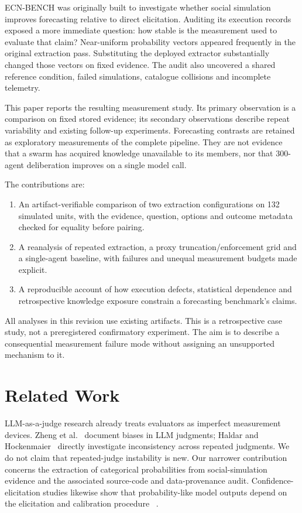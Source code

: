 \documentclass[10pt,conference]{IEEEtran}
\begin{document}
ECN-BENCH was originally built to investigate whether social simulation improves
forecasting relative to direct elicitation. Auditing its execution records exposed
a more immediate question: how stable is the measurement used to evaluate that
claim? Near-uniform probability vectors appeared frequently in the original
extraction pass. Substituting the deployed extractor substantially changed those
vectors on fixed evidence. The audit also uncovered a shared reference condition,
failed simulations, catalogue collisions and incomplete telemetry.

This paper reports the resulting measurement study. Its primary observation is
a comparison on fixed stored evidence; its secondary observations describe
repeat variability and existing follow-up experiments. Forecasting contrasts
are retained as exploratory measurements of the complete pipeline. They are
not evidence that a swarm has acquired knowledge unavailable to its members,
nor that 300-agent deliberation improves on a single model call.

The contributions are:
\begin{enumerate}
\item An artifact-verifiable comparison of two extraction configurations on
132 simulated units, with the evidence, question, options and outcome metadata
checked for equality before pairing.
\item A reanalysis of repeated extraction, a proxy truncation/enforcement grid
and a single-agent baseline, with failures and unequal measurement budgets
made explicit.
\item A reproducible account of how execution defects, statistical dependence
and retrospective knowledge exposure constrain a forecasting benchmark's claims.
\end{enumerate}
All analyses in this revision use existing artifacts. This is a retrospective
case study, not a preregistered confirmatory experiment. The aim is to describe
a consequential measurement failure mode without assigning an unsupported
mechanism to it.

\section{Related Work}
LLM-as-a-judge research already treats evaluators as imperfect measurement
devices. Zheng et al.~\cite{zheng2023} document biases in LLM judgments;
Haldar and Hockenmaier~\cite{haldar2025} directly investigate inconsistency across
repeated judgments. We do not claim that repeated-judge instability is new.
Our narrower contribution concerns the extraction of categorical probabilities
from social-simulation evidence and the associated source-code and data-provenance
audit. Confidence-elicitation studies likewise show that probability-like model
outputs depend on the elicitation and calibration procedure
~\cite{tian2023calibration,xiong2024uncertainty}.
\end{document}
